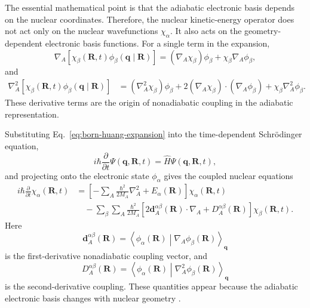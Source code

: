 \documentclass[
  11pt,
  letterpaper,
  onehalfspacing,
  normalmargins,
  equalmargins,
  oneside
]{ut-thesis}
\begin{document}
The essential mathematical point is that the adiabatic electronic basis
depends on the nuclear coordinates. Therefore, the nuclear kinetic-energy
operator does not act only on the nuclear wavefunctions \(\chi_\alpha\). It
also acts on the geometry-dependent electronic basis functions. For a single
term in the expansion,
\begin{equation}
\nabla_A
\left[
\chi_\beta(\mathbf R,t)
\phi_\beta(\mathbf q\mid\mathbf R)
\right]
=
\left(\nabla_A \chi_\beta\right)\phi_\beta
+
\chi_\beta
\nabla_A\phi_\beta ,
\label{eq:first-nuclear-derivative-product}
\end{equation}
and
\begin{align}
\nabla_A^2
\left[
\chi_\beta(\mathbf R,t)
\phi_\beta(\mathbf q\mid\mathbf R)
\right]
&=
\left(\nabla_A^2\chi_\beta\right)\phi_\beta
+
2\left(\nabla_A\chi_\beta\right)\cdot
\left(\nabla_A\phi_\beta\right)
+
\chi_\beta\nabla_A^2\phi_\beta .
\label{eq:second-nuclear-derivative-product}
\end{align}
These derivative terms are the origin of nonadiabatic coupling in the
adiabatic representation.

Substituting Eq.~\eqref{eq:born-huang-expansion} into the time-dependent
Schr\"odinger equation,
\begin{equation}
i\hbar
\frac{\partial}{\partial t}
\Psi(\mathbf q,\mathbf R,t)
=
\hat H
\Psi(\mathbf q,\mathbf R,t),
\label{eq:full-molecular-tdse}
\end{equation}
and projecting onto the electronic state \(\phi_\alpha\) gives the coupled
nuclear equations
\begin{align}
i\hbar
\frac{\partial}{\partial t}
\chi_\alpha(\mathbf R,t)
&=
\left[
-\sum_A
\frac{\hbar^2}{2M_A}
\nabla_A^2
+
E_\alpha(\mathbf R)
\right]
\chi_\alpha(\mathbf R,t)
\nonumber\\
&\quad
-
\sum_{\beta}
\sum_A
\frac{\hbar^2}{2M_A}
\left[
2\mathbf d_A^{\alpha\beta}(\mathbf R)\cdot\nabla_A
+
D_A^{\alpha\beta}(\mathbf R)
\right]
\chi_\beta(\mathbf R,t).
\label{eq:exact-coupled-nuclear-equations}
\end{align}
Here
\begin{equation}
\mathbf d_A^{\alpha\beta}(\mathbf R)
=
\left\langle
\phi_\alpha(\mathbf R)
\middle|
\nabla_A
\phi_\beta(\mathbf R)
\right\rangle_{\mathbf q}
\label{eq:first-derivative-coupling}
\end{equation}
is the first-derivative nonadiabatic coupling vector, and
\begin{equation}
D_A^{\alpha\beta}(\mathbf R)
=
\left\langle
\phi_\alpha(\mathbf R)
\middle|
\nabla_A^2
\phi_\beta(\mathbf R)
\right\rangle_{\mathbf q}
\label{eq:second-derivative-coupling}
\end{equation}
is the second-derivative coupling. These quantities appear because the
adiabatic electronic basis changes with nuclear geometry
\cite{Baer2006Book,KendrickMeadTruhlar2002}.
\end{document}

